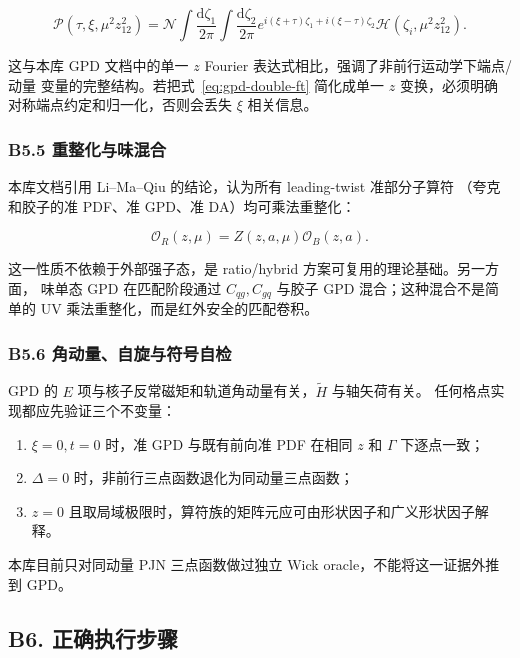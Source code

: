 \documentclass[UTF8]{ctexart}
\newcommand{\dd}{\mathrm{d}}
\begin{document}
\begin{equation}
\mathcal P(\tau,\xi,\mu^2z_{12}^2)
=\mathcal N\int\frac{\dd\zeta_1}{2\pi}\int\frac{\dd\zeta_2}{2\pi}
e^{i(\xi+\tau)\zeta_1+i(\xi-\tau)\zeta_2}
\mathcal H(\zeta_i,\mu^2z_{12}^2).
\label{eq:gpd-double-ft}
\end{equation}

这与本库 GPD 文档中的单一 $z$ Fourier 表达式相比，强调了非前行运动学下端点/动量
变量的完整结构。若把式~\eqref{eq:gpd-double-ft} 简化成单一 $z$ 变换，必须明确
对称端点约定和归一化，否则会丢失 $\xi$ 相关信息。 \cite{D2,P1}

\subsubsection{B5.5 重整化与味混合}

本库文档引用 Li--Ma--Qiu 的结论，认为所有 leading-twist 准部分子算符
（夸克和胶子的准 PDF、准 GPD、准 DA）均可乘法重整化：

\begin{equation}
\mathcal O_R(z,\mu)=Z(z,a,\mu)\mathcal O_B(z,a).
\label{eq:multiplicative}
\end{equation}

这一性质不依赖于外部强子态，是 ratio/hybrid 方案可复用的理论基础。另一方面，
味单态 GPD 在匹配阶段通过 $C_{qg},C_{gq}$ 与胶子 GPD 混合；这种混合不是简单的
UV 乘法重整化，而是红外安全的匹配卷积。 \cite{D5,D6,P1}

\subsubsection{B5.6 角动量、自旋与符号自检}

GPD 的 $E$ 项与核子反常磁矩和轨道角动量有关，$\widetilde H$ 与轴矢荷有关。
任何格点实现都应先验证三个不变量：
\begin{enumerate}
\item $\xi=0,t=0$ 时，准 GPD 与既有前向准 PDF 在相同 $z$ 和 $\Gamma$ 下逐点一致；
\item $\Delta=0$ 时，非前行三点函数退化为同动量三点函数；
\item $z=0$ 且取局域极限时，算符族的矩阵元应可由形状因子和广义形状因子解释。
\end{enumerate}

本库目前只对同动量 PJN 三点函数做过独立 Wick oracle，不能将这一证据外推到 GPD。
\cite{C13}

\subsection{B6. 正确执行步骤}
\end{document}
